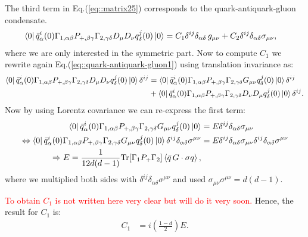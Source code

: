 \documentclass[openright,twoside,12pt,a4paper,final]{article}
\begin{document}
    The third term in Eq.(\ref{eq::matrix25}) corresponds to the quark-antiquark-gluon condensate.
    \begin{align}
        \bra{0}\bar{q}^{i}_{\alpha}(0) \Gamma_{1, \alpha \beta} P_{+, \beta \gamma} \Gamma_{2, \gamma \delta} D_{\mu} D_{\nu} q^{j}_{\delta}(0) \ket{0}  &= C_{1} \delta^{ij} \delta_{\alpha \delta} \, g_{\mu \nu} + C_{2}  \delta^{ij} \delta_{\alpha \delta} \sigma_{\mu \nu},
        \label{eq::quark-antiquark-gluon1}
    \end{align}
    where we are only interested in the symmetric part. Now to compute $C_{1}$ we rewrite again Eq.(\ref{eq::quark-antiquark-gluon1}) using translation invariance as:
    \begin{align}
        \bra{0}\bar{q}^{i}_{\alpha}(0) \Gamma_{1, \alpha \beta} P_{+, \beta \gamma} \Gamma_{2, \gamma \delta} D_{\mu} D_{\nu} q^{j}_{\delta}(0) \ket{0} \delta^{ij} &= \bra{0}\bar{q}^{i}_{\alpha}(0) \Gamma_{1, \alpha \beta} P_{+, \beta \gamma} \Gamma_{2, \gamma \delta} G_{\mu \nu} q^{j}_{\delta}(0) \ket{0} \delta^{ij} \nonumber \\
        & +\bra{0}\bar{q}^{i}_{\alpha}(0) \Gamma_{1, \alpha \beta} P_{+, \beta \gamma} \Gamma_{2, \gamma \delta} D_{\nu} D_{\mu} q^{j}_{\delta}(0) \ket{0} \delta^{ij}.
    \end{align}
    Now by using Lorentz covariance we can re-express the first term:
    \begin{align}
        \bra{0}\bar{q}^{i}_{\alpha}(0) \Gamma_{1, \alpha \beta} P_{+, \beta \gamma} \Gamma_{2, \gamma \delta} G_{\mu \nu} q^{j}_{\delta}(0) \ket{0}  &= E \delta^{ij} \delta_{\alpha \delta} \sigma_{\mu\nu} \nonumber \\
        \Leftrightarrow \bra{0}\bar{q}^{i}_{\alpha}(0) \Gamma_{1, \alpha \beta} P_{+, \beta \gamma} \Gamma_{2, \gamma \delta} G_{\mu \nu} q^{j}_{\delta}(0) \ket{0} \delta^{ij} \delta_{\alpha \delta} \sigma^{\mu \nu} &= E \delta^{ij} \delta_{\alpha \delta} \sigma_{\mu\nu} \delta^{ij} \delta_{\alpha \delta} \sigma^{\mu\nu} \nonumber \\
        \Rightarrow E = \frac{1}{12 d(d-1)} \text{Tr}[\Gamma_{1} P_{+} \Gamma_{2}]\braket{\bar{q} \, G \cdot \sigma q},
    \end{align}
    where we multiplied both sides with $\delta^{ij} \delta_{\alpha \delta} \sigma^{\mu\nu}$ and used $\sigma_{\mu \nu} \sigma^{\mu \nu} = d(d-1)$.
    
    \newpage
    \textcolor{red}{To obtain $C_{1}$ is not written here very clear but will do it very soon.}
    Hence, the result for $C_{1}$ is:
    \begin{align}
        C_{1} &= i \left(\frac{1-d}{2} \right) E.
    \end{align}
    
\end{document}
